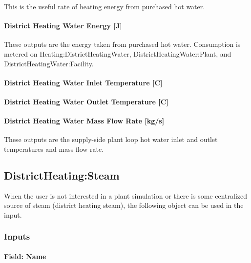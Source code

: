 This is the useful rate of heating energy from purchased hot water.

\paragraph{District Heating Water Energy {[}J{]}}\label{district-heating-hot-water-energy-j}

These outputs are the energy taken from purchased hot water. Consumption is metered on Heating:DistrictHeatingWater, DistrictHeatingWater:Plant, and DistrictHeatingWater:Facility.

\paragraph{District Heating Water Inlet Temperature {[}C{]}}\label{district-heating-inlet-temperature-c}

\paragraph{District Heating Water Outlet Temperature {[}C{]}}\label{district-heating-outlet-temperature-c}

\paragraph{District Heating Water Mass Flow Rate {[}kg/s{]}}\label{district-heating-mass-flow-rate-kgs}

These outputs are the supply-side plant loop hot water inlet and outlet temperatures and mass flow rate.

\subsection{DistrictHeating:Steam}\label{districtheatingsteam}

When the user is not interested in a plant simulation or there is some centralized source of steam (district heating steam), the following object can be used in the input.

\subsubsection{Inputs}\label{inputs-17-006-1}

\paragraph{Field: Name}\label{field-name-16-006-1}

